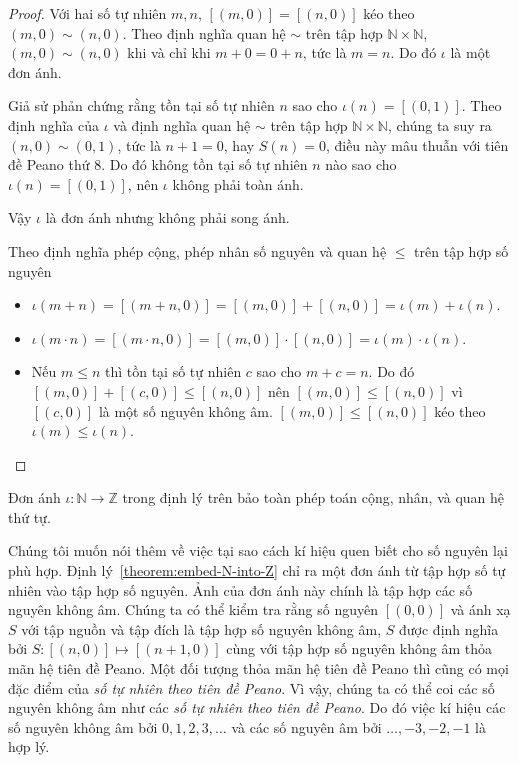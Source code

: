 \begin{proof}
	Với hai số tự nhiên $m, n$, $[(m, 0)] = [(n, 0)]$ kéo theo $(m, 0)\sim (n, 0)$. Theo định nghĩa quan hệ $\sim$ trên tập hợp $\mathbb{N}\times\mathbb{N}$, $(m, 0)\sim (n, 0)$ khi và chỉ khi $m + 0 = 0 + n$, tức là $m = n$. Do đó $\iota$ là một đơn ánh.

	Giả sử phản chứng rằng tồn tại số tự nhiên $n$ sao cho $\iota(n) = [(0, 1)]$. Theo định nghĩa của $\iota$ và định nghĩa quan hệ $\sim$ trên tập hợp $\mathbb{N}\times\mathbb{N}$, chúng ta suy ra $(n, 0)\sim (0, 1)$, tức là $n + 1 = 0$, hay $S(n) = 0$, điều này mâu thuẫn với tiên đề Peano thứ 8. Do đó không tồn tại số tự nhiên $n$ nào sao cho $\iota(n) = [(0, 1)]$, nên $\iota$ không phải toàn ánh.

	Vậy $\iota$ là đơn ánh nhưng không phải song ánh.

	Theo định nghĩa phép cộng, phép nhân số nguyên và quan hệ $\leq$ trên tập hợp số nguyên
	\begin{itemize}
		\item $\iota(m + n) = [(m + n, 0)] = [(m, 0)] + [(n, 0)] = \iota(m) + \iota(n)$.
		\item $\iota(m\cdot n) = [(m\cdot n, 0)] = [(m, 0)]\cdot [(n, 0)] = \iota(m)\cdot\iota(n)$.
		\item Nếu $m\leq n$ thì tồn tại số tự nhiên $c$ sao cho $m + c = n$. Do đó $[(m, 0)] + [(c, 0)]\leq [(n, 0)]$ nên $[(m, 0)]\leq [(n, 0)]$ vì $[(c, 0)]$ là một số nguyên không âm. $[(m, 0)]\leq [(n, 0)]$ kéo theo $\iota(m)\leq\iota(n)$.
	\end{itemize}
\end{proof}

Đơn ánh $\iota: \mathbb{N}\to \mathbb{Z}$ trong định lý trên bảo toàn phép toán cộng, nhân, và quan hệ thứ tự.

Chúng tôi muốn nói thêm về việc tại sao cách kí hiệu quen biết cho số nguyên lại phù hợp. Định lý~\ref{theorem:embed-N-into-Z} chỉ ra một đơn ánh từ tập hợp số tự nhiên vào tập hợp số nguyên. Ảnh của đơn ánh này chính là tập hợp các số nguyên không âm. Chúng ta có thể kiểm tra rằng số nguyên $[(0,0)]$ và ánh xạ $S$ với tập nguồn và tập đích là tập hợp số nguyên không âm, $S$ được định nghĩa bởi $S: [(n,0)] \mapsto [(n+1,0)]$ cùng với tập hợp số nguyên không âm thỏa mãn hệ tiên đề Peano. Một đối tượng thỏa mãn hệ tiên đề Peano thì cũng có mọi đặc điểm của \textit{số tự nhiên theo tiên đề Peano}. Vì vậy, chúng ta có thể coi các số nguyên không âm như các \textit{số tự nhiên theo tiên đề Peano}. Do đó việc kí hiệu các số nguyên không âm bởi $0, 1, 2, 3,\ldots$ và các số nguyên âm bởi $\ldots, -3, -2, -1$ là hợp lý.

